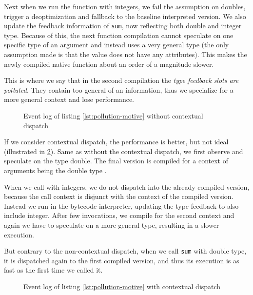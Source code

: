 Next when we run the function with integers, we fail the assumption on doubles, trigger a deoptimization and fallback to the baseline interpreted version. We also update the feedback information of \texttt{sum}, now reflecting both double and integer type. Because of this, the next function compilation cannot speculate on one specific type of an argument and instead uses a very general type (the only assumption made is that the value does not have any attributes). This makes the newly compiled native function about an order of a magnitude slower.

This is where we say that in the second compilation the \textit{type feedback slots are polluted}. They contain too general of an information, thus we specialize for a more general context and lose performance.

\begin{figure}
	\centering
	\begin{adjustwidth}{-3cm}{-3cm}
	\end{adjustwidth}
	\caption{Event log of listing \ref{lst:pollution-motive} without contextual dispatch}\label{fig:pollution-motive-baseline}
\end{figure}

If we consider contextual dispatch, the performance is better, but not ideal (illustrated in \ref{fig:pollution-motive-context}). Same as without the contextual dispatch, we first observe and speculate on the type double. The final version is compiled for a context of arguments being the double type .

When we call with integers, we do not dispatch into the already compiled version, because the call context is disjunct with the context of the compiled version. Instead we run in the bytecode interpreter, updating the type feedback to also include integer. After few invocations, we compile for the second context and again we have to speculate on a more general type, resulting in a slower execution.

But contrary to the non-contextual dispatch, when we call \texttt{sum} with double type, it is dispatched again to the first compiled version, and thus its execution is as fast as the first time we called it.

\begin{figure}
	\centering
	\begin{adjustwidth}{-3cm}{-3cm}
	\end{adjustwidth}
	\caption{Event log of listing \ref{lst:pollution-motive} with contextual dispatch}\label{fig:pollution-motive-context}
\end{figure}

